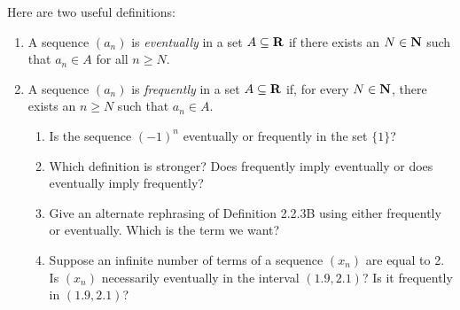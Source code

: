 \documentclass{lew98_solutions}
\begin{document}
\begin{exercise}
\label{ex:2.2.7}
    Here are two useful definitions:
    \begin{enumerate}[label = (\roman*)]
        \item A sequence \( (a_n) \) is \textit{eventually} in a set \( A \subseteq \mathbf{R} \) if there exists an \( N \in \mathbf{N} \) such that \( a_n \in A \) for all \( n \geq N \).

        \item A sequence \( (a_n) \) is \textit{frequently} in a set \( A \subseteq \mathbf{R} \) if, for every \( N \in \mathbf{N} \), there exists an \( n \geq N \) such that \( a_n \in A \).
        \begin{enumerate}
            \item Is the sequence \( (-1)^n \) eventually or frequently in the set \( \{ 1 \} \)?

            \item Which definition is stronger? Does frequently imply eventually or does eventually imply frequently?

            \item Give an alternate rephrasing of Definition 2.2.3B using either frequently or eventually. Which is the term we want?

            \item Suppose an infinite number of terms of a sequence \( (x_n) \) are equal to 2. Is \( (x_n) \) necessarily eventually in the interval \( (1.9, 2.1) \)? Is it frequently in \( (1.9, 2.1) \)?
        \end{enumerate}
    \end{enumerate}
\end{exercise}
\end{document}
